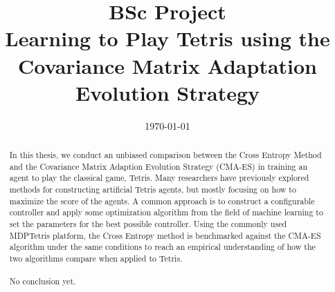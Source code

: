 







\title{BSc Project\\\textbf{Learning to Play Tetris using
    the Covariance Matrix Adaptation
    Evolution Strategy}}
\date{\today}
\maketitle

\tableofcontents

\clearpage

\begin{abstract}
In this thesis, we conduct an unbiased comparison between 
the Cross Entropy Method and the Covariance Matrix Adaption
Evolution Strategy (CMA-ES) in training 
an agent to play the classical game, Tetris. Many researchers have 
previously explored methods for constructing artificial Tetris
agents, but mostly focusing on how to maximize the score of the agents.
A common approach is to construct a configurable controller
and apply some optimization algorithm from the field of machine learning
to set the parameters for the best possible controller. Using the 
commonly used MDPTetris \citep{mdptetris} platform, the Cross Entropy
method is benchmarked against the CMA-ES algorithm under the same
conditions to reach an empirical understanding of how the two algorithms
compare when applied to Tetris.\\
\\
No conclusion yet.
\end{abstract}















\clearpage

\begin{appendices}



\end{appendices}


